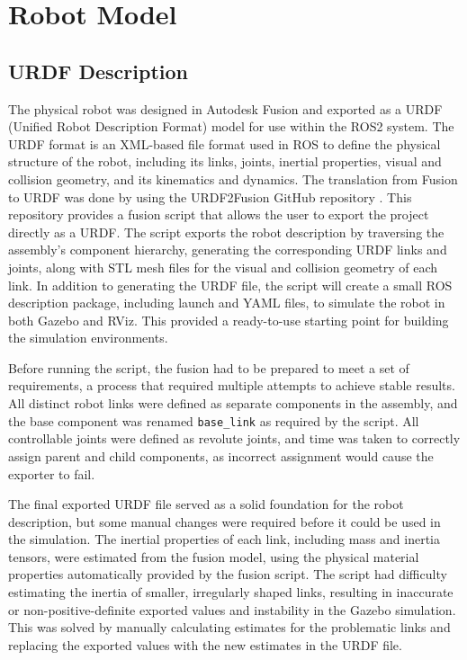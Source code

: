 \section{Robot Model}
\subsection{URDF Description}
The physical robot was designed in Autodesk Fusion and exported as a URDF (Unified Robot Description Format) model for use within the ROS2 system. The URDF format is an XML-based file format used in ROS to define the physical structure of the robot, including its links, joints, inertial properties, visual and collision geometry, and its kinematics and dynamics. The translation from Fusion to URDF was done by using the URDF2Fusion GitHub repository \cite{toshinori2020fusion2urdf}. This repository provides a fusion script that allows the user to export the project directly as a URDF. The script exports the robot description by traversing the assembly's component hierarchy, generating the corresponding URDF links and joints, along with STL mesh files for the visual and collision geometry of each link. In addition to generating the URDF file, the script will create a small ROS description package, including launch and YAML files, to simulate the robot in both Gazebo and RViz. This provided a ready-to-use starting point for building the simulation environments.

Before running the script, the fusion had to be prepared to meet a set of requirements, a process that required multiple attempts to achieve stable results. All distinct robot links were defined as separate components in the assembly, and the base component was renamed \texttt{base\_link} as required by the script. All controllable joints were defined as revolute joints, and time was taken to correctly assign parent and child components, as incorrect assignment would cause the exporter to fail.

The final exported URDF file served as a solid foundation for the robot description, but some manual changes were required before it could be used in the simulation. The inertial properties of each link, including mass and inertia tensors, were estimated from the fusion model, using the physical material properties automatically provided by the fusion script. The script had difficulty estimating the inertia of smaller, irregularly shaped links, resulting in inaccurate or non-positive-definite exported values and instability in the Gazebo simulation. This was solved by manually calculating estimates for the problematic links and replacing the exported values with the new estimates in the URDF file.

